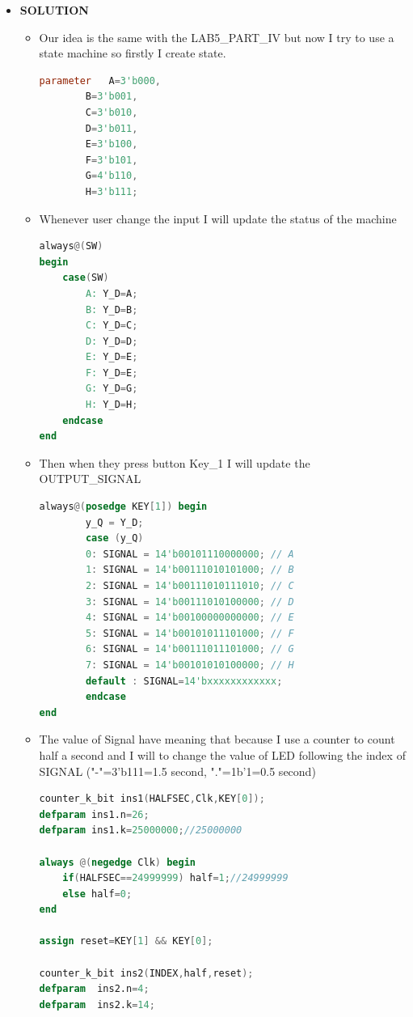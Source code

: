 \begin{itemize}
    \item []\textbf{SOLUTION}
        \begin{itemize}
            \item []Our idea is the same with the LAB5\_PART\_IV but now I try to use a state machine so firstly I create state.
                \begin{lstlisting}[language=verilog]
parameter   A=3'b000,
        B=3'b001,
        C=3'b010,
        D=3'b011,
        E=3'b100,
        F=3'b101,
        G=4'b110,
        H=3'b111;
                \end{lstlisting}
            \item []Whenever user change the input I will update the status of the machine
                \begin{lstlisting}[language=verilog]
always@(SW)
begin 
    case(SW)
        A: Y_D=A;
        B: Y_D=B;
        C: Y_D=C;
        D: Y_D=D;
        E: Y_D=E;
        F: Y_D=E;
        G: Y_D=G;
        H: Y_D=H;
    endcase
end
                \end{lstlisting}
            \item []Then when they press button Key\_1 I will update the OUTPUT\_SIGNAL
                \begin{lstlisting}[language=verilog]
always@(posedge KEY[1]) begin
        y_Q = Y_D;
        case (y_Q)
        0: SIGNAL = 14'b00101110000000; // A
        1: SIGNAL = 14'b00111010101000; // B
        2: SIGNAL = 14'b00111010111010; // C
        3: SIGNAL = 14'b00111010100000; // D
        4: SIGNAL = 14'b00100000000000; // E
        5: SIGNAL = 14'b00101011101000; // F
        6: SIGNAL = 14'b00111011101000; // G
        7: SIGNAL = 14'b00101010100000; // H
        default : SIGNAL=14'bxxxxxxxxxxxx;
        endcase
end
                \end{lstlisting}
            \item []The value of Signal have meaning that because I use a counter to count half a second and I will to change the value of LED following the index of SIGNAL ("-"=3'b111=1.5 second, "."=1b'1=0.5 second)
                \begin{lstlisting}[language=verilog]
counter_k_bit ins1(HALFSEC,Clk,KEY[0]);
defparam ins1.n=26;
defparam ins1.k=25000000;//25000000

always @(negedge Clk) begin
    if(HALFSEC==24999999) half=1;//24999999
    else half=0;
end

assign reset=KEY[1] && KEY[0];

counter_k_bit ins2(INDEX,half,reset);
defparam  ins2.n=4;
defparam  ins2.k=14;


\end{lstlisting}
\end{itemize}
\end{itemize}
